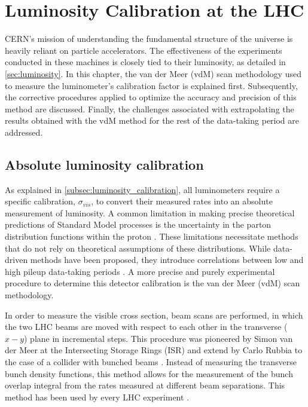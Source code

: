 \chapter{Luminosity Calibration at the LHC}

CERN’s mission of understanding the fundamental structure of the universe is heavily reliant on particle accelerators. The effectiveness of the experiments conducted in these machines is closely tied to their luminosity, as detailed in \autoref{sec:luminosity}. 
In this chapter, the van der Meer (vdM) scan methodology used to measure the luminometer's calibration factor is explained first. Subsequently, the corrective procedures applied to optimize the accuracy and precision of this method are discussed. Finally, the challenges associated with extrapolating the results obtained with the vdM method for the rest of the data-taking period are addressed.
\section{Absolute luminosity calibration}
\label{sec:absolute_luminosity_calibration}

As explained in \autoref{subsec:luminosity_calibration}, all luminometers require a specific calibration, $\sigma_{vis}$, to convert their measured rates into an absolute measurement of luminosity. A common limitation in making precise theoretical predictions of Standard Model processes is the uncertainty in the parton distribution functions within the proton \cite{GRAFSTROM201597}. These limitations necessitate methods that do not rely on theoretical assumptions of these distributions. While data-driven methods have been proposed, they introduce correlations between low and high pileup data-taking periods \cite{Salfeld-Nebgen_2018}. A more precise and purely experimental procedure to determine this detector calibration is the van der Meer (vdM) scan methodology.

In order to measure the visible cross section, beam scans are performed, in which the two LHC beams are moved with respect to each other in the transverse ($x-y$) plane in incremental steps. This procedure was pioneered by Simon van der Meer at the Intersecting Storage Rings (ISR) \cite{vanderMeer:296752} and extend by Carlo Rubbia to the case of a collider with bunched beams \cite{Rubbia:1025746}. Instead of measuring the transverse bunch density functions, this method allows for the measurement of the bunch overlap integral from the rates measured at different beam separations. This method has been used by every LHC experiment \cite{TheLHCbcollaboration_2014, ALICE-PUBLIC-2021-001, Maettig:1513982, Sirunyan:2759951}.

